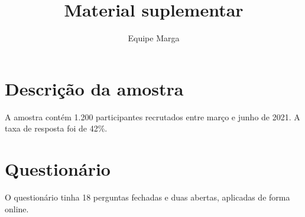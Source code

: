 \documentclass[11pt]{article}
\title{Material suplementar}
\author{Equipe Marga}
\date{}
\begin{document}
\maketitle

\section{Descrição da amostra}

A amostra contém 1.200 participantes recrutados entre março e junho de 2021. A taxa de resposta foi de 42\%.

\section{Questionário}

O questionário tinha 18 perguntas fechadas e duas abertas, aplicadas de forma online.
\end{document}
